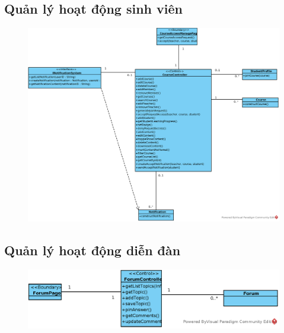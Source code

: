 \documentclass[./../main_file.tex]{subfiles}
\begin{document}
\subsection{Quản lý hoạt động sinh viên }
\begin{figure}[H]
	\centering
	\includegraphics[width=\linewidth]{./images/define_operations/ucd_method_ss_manage_student_activity.eps}
\end{figure}
\subsection{Quản lý hoạt động diễn đàn}
\begin{figure}[H]
	\centering
	\includegraphics[width=\linewidth]{./images/define_operations/ucd_method_manage_forum.eps}
\end{figure}
\end{document}
